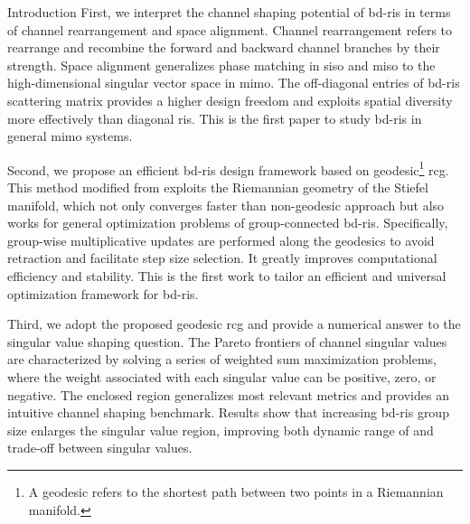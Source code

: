 \documentclass[journal]{IEEEtran}
\begin{document}
\begin{section}{Introduction}
	First, we interpret the channel shaping potential of \gls{bd}-\gls{ris} in terms of channel rearrangement and space alignment.
	Channel rearrangement refers to rearrange and recombine the forward and backward channel branches by their strength.
	Space alignment generalizes phase matching in \gls{siso} and \gls{miso} to the high-dimensional singular vector space in \gls{mimo}.
	The off-diagonal entries of \gls{bd}-\gls{ris} scattering matrix provides a higher design freedom and exploits spatial diversity more effectively than diagonal \gls{ris}.
	This is the first paper to study \gls{bd}-\gls{ris} in general \gls{mimo} systems.

	Second, we propose an efficient \gls{bd}-\gls{ris} design framework based on geodesic\footnote{A geodesic refers to the shortest path between two points in a Riemannian manifold.} \gls{rcg}.
	This method modified from \cite{Abrudan2008,Abrudan2009} exploits the Riemannian geometry of the Stiefel manifold, which not only converges faster than non-geodesic approach \cite{Absil2009,Pan2022d} but also works for general optimization problems of group-connected \gls{bd}-\gls{ris}.
	Specifically, group-wise multiplicative updates are performed along the geodesics to avoid retraction and facilitate step size selection.
	It greatly improves computational efficiency and stability.
	This is the first work to tailor an efficient and universal optimization framework for \gls{bd}-\gls{ris}.

	Third, we adopt the proposed geodesic \gls{rcg} and provide a numerical answer to the singular value shaping question.
	The {Pareto frontiers} of channel singular values are characterized by solving a series of weighted sum maximization problems, where the weight associated with each singular value can be positive, zero, or negative.
	The enclosed region generalizes most relevant metrics and provides an intuitive channel shaping benchmark.
	Results show that increasing \gls{bd}-\gls{ris} group size enlarges the singular value region, improving both dynamic range of and trade-off between singular values.


\end{section}
\end{document}
